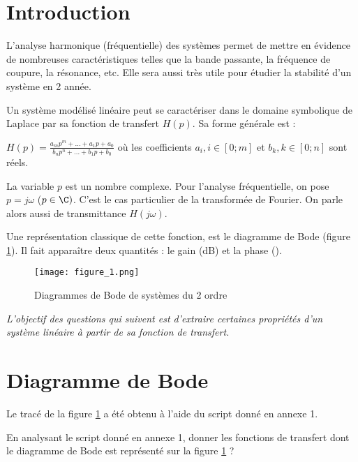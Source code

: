 
 \section*{Introduction}

L'analyse harmonique (fréquentielle) des systèmes permet de mettre en évidence de nombreuses caractéristiques telles que la bande passante, la fréquence de coupure, la résonance, etc.
Elle sera aussi très utile pour étudier la stabilité d'un système en 2 année.

Un système modélisé linéaire peut se caractériser dans le domaine symbolique de Laplace par sa fonction de transfert $H(p)$. Sa forme générale est :

$H(p) = \frac{{{a_m}{p^m} + ... + {a_1}p + {a_0}}}{{{b_n}{p^n} + ... + {b_1}p + {b_0}}}$ où les coefficients $a_i, i \in [0;m]$ et $b_k, k \in [0;n]$ sont réels.

La variable $p$ est un nombre complexe. Pour l'analyse fréquentielle, on pose $p=j \omega$ ($p\in \C)$. C'est le cas particulier de la transformée de Fourier. On parle alors aussi de transmittance $H(j \omega)$.

Une représentation classique de cette fonction, est le diagramme de Bode (figure \ref{Fig1}). Il fait apparaître deux quantités : le gain (dB) et la phase (\degres).

\begin{figure}[!h]
\begin{center}
\texttt{[image: figure\_1.png]} 
\caption{\label{Fig1} Diagrammes de Bode de systèmes du 2 ordre}
\end{center}
\end{figure}

\begin{dBox}
\textit{L'objectif des questions qui suivent est d'extraire certaines propriétés d'un système linéaire à partir de sa fonction de transfert.}
\end{dBox}


 \section*{Diagramme de Bode}

Le tracé de la figure \ref{Fig1} a été obtenu à l'aide du script donné en annexe 1.

 
\question{} En analysant le script donné en annexe 1, donner les fonctions de transfert dont le diagramme de Bode est représenté sur la figure \ref{Fig1} ?
 

